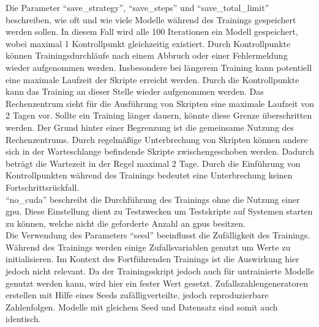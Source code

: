 Die Parameter \enquote{save\_strategy}, \enquote{save\_steps} und \enquote{save\_total\_limit} beschreiben, wie oft und wie viele Modelle während des Trainings gespeichert werden sollen.
In diesem Fall wird alle 100 Iterationen ein Modell gespeichert, wobei maximal 1 Kontrollpunkt gleichzeitig existiert.
Durch Kontrollpunkte können Trainingsdurchläufe nach einem Abbruch oder einer Fehlermeldung wieder aufgenommen werden.
Insbesondere bei längerem Training kann potentiell eine maximale Laufzeit der Skripte erreicht werden.
Durch die Kontrollpunkte kann das Training an dieser Stelle wieder aufgenommen werden.
Das Rechenzentrum sieht für die Ausführung von Skripten eine maximale Laufzeit von 2 Tagen vor.
Sollte ein Training länger dauern, könnte diese Grenze überschritten werden.
Der Grund hinter einer Begrenzung ist die gemeinsame Nutzung des Rechenzentrums.
Durch regelmäßige Unterbrechung von Skripten können andere sich in der Warteschlange befindende Skripte zwischengeschoben werden.
Dadurch beträgt die Wartezeit in der Regel maximal 2 Tage.
Durch die Einführung von Kontrollpunkten während des Trainings bedeutet eine Unterbrechung keinen Fortschrittsrückfall.\\

\enquote{no\_cuda} beschreibt die Durchführung des Trainings ohne die Nutzung einer \ac{gpu}.
Diese Einstellung dient zu Testzwecken um Testskripte auf Systemen starten zu können, welche nicht die geforderte Anzahl an \ac{gpu}s besitzen.\\

Die Verwendung des Parameters \enquote{seed} beeinflusst die Zufälligkeit des Trainings.
Während des Trainings werden einige Zufallsvariablen genutzt um Werte zu initialisieren.
Im Kontext des Fortführenden Trainings ist die Auswirkung hier jedoch nicht relevant.
Da der Trainingsskript jedoch auch für untrainierte Modelle genutzt werden kann, wird hier ein fester Wert gesetzt.
Zufallszahlengeneratoren erstellen mit Hilfe eines Seeds zufälligverteilte, jedoch reproduzierbare Zahlenfolgen.
Modelle mit gleichem Seed und Datensatz sind somit auch identisch.\\

